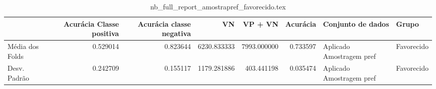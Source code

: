 \begin{table}
\centering
\caption{nb_full_report_amostrapref_favorecido.tex}
\label{nb_full_report_amostrapref_favorecido.tex}
\begin{tabular}{lrrrrrll}
\toprule
{}              &  Acurácia Classe positiva &  Acurácia classe negativa &          VN  &     VP + VN  &  Acurácia &         Conjunto de dados &       Grupo \\
\midrule
Média dos Folds &                  0.529014 &                  0.823644 &  6230.833333 &  7993.000000 &  0.733597 &  Aplicado Amostragem pref &  Favorecido \\
Desv. Padrão    &                  0.242709 &                  0.155117 &  1179.281886 &   403.441198 &  0.035474 &  Aplicado Amostragem pref &  Favorecido \\
\bottomrule
\end{tabular}
\end{table}
